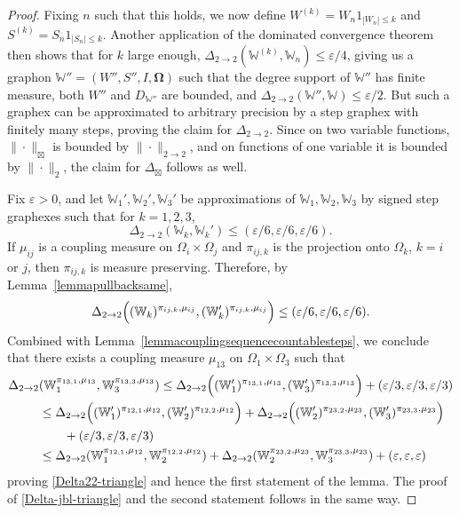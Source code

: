 \documentclass{amsart}
\numberwithin{equation}{section}
\numberwithin{figure}{section}
\theoremstyle{definition}
\theoremstyle{remark}
\newcommand{\jbl}{{\boxtimes}}
\newcommand{\eps}{\varepsilon}
\newcommand{\bOmega}{{\mathbf{\Omega}}}
\newcommand{\cW}{\mathbb{W}}
\begin{document}
\begin{proof}
Fixing $n$ such that this holds, we now define $W^{(k)}=W_n1_{|W_n|\leq k}$
and $S^{(k)}=S_n 1_{|S_n|\leq k}$. Another application of the dominated
convergence theorem then shows that for $k$ large enough, $\Delta_{2\to
2}(\cW^{(k)},\cW_{n})\leq \eps /4$, giving us a graphon
$\cW''=(W'',S'',I,\bOmega)$ such that the degree support of $\cW''$ has
finite measure, both $W''$ and $D_{\cW''}$ are bounded, and $\Delta_{2\to
2}(\cW'',\cW)\leq \eps /2$. But such a graphex can be approximated to
arbitrary precision by a step graphex with finitely many steps, proving the
claim for $\Delta_{2\to 2}$. Since on two variable functions,
$\|\cdot\|_{\jbl}$ is bounded by $\|\cdot\|_{2\to 2}$, and on functions of
one variable it is bounded by $\|\cdot\|_2$, the claim for $\Delta_{\jbl}$
follows as well.

Fix $\varepsilon>0$, and let $\cW_1',\cW_2',\cW_3'$ be approximations of
$\cW_1,\cW_2,\cW_3$ by signed step graphexes such that for $k=1,2,3$,
\[
\Delta_{2\to 2}(\cW_k,\cW_k') \le (\varepsilon/6,\varepsilon/6,\varepsilon/6).
\]
If $\mu_{ij}$ is a coupling measure on $\Omega_i\times\Omega_j$ and
$\pi_{ij,k}$ is the projection onto $\Omega_k$, $k=i$ or $j$, then
$\pi_{ij,k}$ is measure preserving. Therefore, by
Lemma~\ref{lemmapullbacksame},
\[
\Delta_{2\to 2}\Bigl((\cW_k)^{\pi_{ij,k},\mu_{ij}},(\cW_k')^{\pi_{ij,k},\mu_{ij}}\Bigr) \le (\varepsilon/6,\varepsilon/6,\varepsilon/6).
\]
Combined with Lemma~\ref{lemmacouplingsequencecountablesteps}, we conclude
that there exists a coupling measure $\mu_{13}$ on $\Omega_1\times\Omega_3$
such that
\begin{align*}
\Delta_{2\to 2}&(\cW_1^{\pi_{13,1},\mu_{13}},\cW_3^{\pi_{13,3},\mu_{13}})
\le
\Delta_{2\to 2}\Bigl((\cW_1')^{\pi_{13,1},\mu_{13}},(\cW_3')^{\pi_{13,3},\mu_{13}}\Bigr)
+(\eps/3,\eps/3,\eps/3)
\\
&\le
\Delta_{2\to 2}\Bigl((\cW_1')^{\pi_{12,1},\mu_{12}},(\cW_2')^{\pi_{12,2},\mu_{12}}\Bigr)
+\Delta_{2\to 2}\Bigl((\cW_2')^{\pi_{23,2},\mu_{23}},(\cW_3')^{\pi_{23,3},\mu_{23}}\Bigr)
\\
&\qquad\phantom{}+(\eps/3,\eps/3,\eps/3)
\\
&\le
\Delta_{2\to 2}(\cW_1^{\pi_{12,1},\mu_{12}},\cW_2^{\pi_{12,2},\mu_{12}})
+\Delta_{2\to 2}(\cW_2^{\pi_{23,2},\mu_{23}},\cW_3^{\pi_{23,3},\mu_{23}})
+(\varepsilon,\varepsilon,\varepsilon)
\end{align*}
proving \eqref{Delta22-triangle} and hence the first statement of the lemma.
The proof of \eqref{Delta-jbl-triangle} and the second statement follows in
the same way.
\end{proof}
\end{document}
